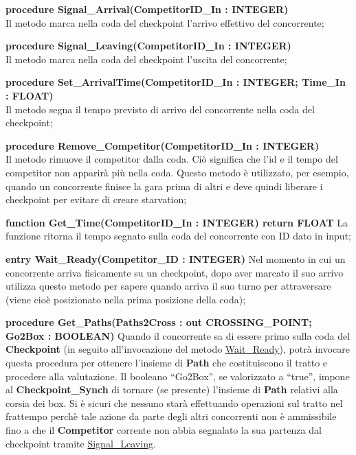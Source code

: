 \begin{description}
\item{\textbf{procedure Signal\_Arrival(CompetitorID\_In : INTEGER)}}\\
Il metodo marca nella coda del checkpoint l'arrivo effettivo del concorrente;
\item{\textbf{procedure Signal\_Leaving(CompetitorID\_In : INTEGER)}}\\
Il metodo marca nella coda del checkpoint l'uscita del concorrente;
\item{\textbf{procedure Set\_ArrivalTime(CompetitorID\_In : INTEGER; Time\_In : FLOAT)}}\\
Il metodo segna il tempo previsto di arrivo del concorrente nella coda del checkpoint;
\item{\textbf{procedure Remove\_Competitor(CompetitorID\_In : INTEGER)}}\\
Il metodo rimuove il competitor dalla coda. Ci\`{o} significa che l'id e il tempo del competitor non apparir\`{a} pi\`{u}
nella coda. Questo metodo \`{e} utilizzato, per esempio, quando un concorrente finisce la gara prima di altri
e deve quindi liberare i checkpoint per evitare di creare starvation;
\item{\textbf{function Get\_Time(CompetitorID\_In : INTEGER) return FLOAT}}
La funzione ritorna il tempo segnato sulla coda del concorrente con ID dato in input;
\item{\textbf{entry Wait\_Ready(Competitor\_ID : INTEGER)}}
Nel momento in cui un concorrente arriva fisicamente su un checkpoint, dopo aver marcato il suo arrivo
utilizza questo metodo per sapere quando arriva il suo turno per attraversare (viene cio\`{e} posizionato nella prima posizione della coda);
\item{\textbf{procedure Get\_Paths(Paths2Cross : out CROSSING\_POINT;  Go2Box : BOOLEAN)}}
Quando il concorrente sa di essere primo sulla coda del \textbf{Checkpoint}
(in seguito all'invocazione del metodo \underline{Wait\_Ready}), potr\`{a} invocare questa procedura per
ottenere l'insieme di \textbf{Path} che costituiscono il tratto e procedere alla valutazione. Il booleano ``Go2Box'', se valorizzato a ``true'',
impone al \textbf{Checkpoint\_Synch} di tornare (se presente) l'insieme di \textbf{Path} relativi alla corsia dei box.
Si \`{e} sicuri che nessuno star\`{a} effettuando operazioni sul tratto nel frattempo perch\`{e} tale azione da parte
degli altri concorrenti non \`{e} ammissibile fino a che il \textbf{Competitor} corrente non abbia segnalato la sua partenza dal checkpoint
tramite \underline{Signal\_Leaving}.
\end{description}
